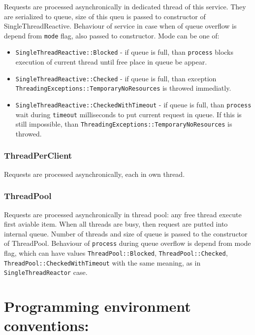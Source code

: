 \documentclass[10pt]{article}
\begin{document}
  Requests are processed asynchronically in dedicated thread of this service.
They are serialized to queue, size of this queu is passed to constructor
 of SingleThreadReactive. Behaviour of service in case when of queue overflow
is depend from \verb|mode| flag, also passed to constructor.
 Mode can be one of:
 \begin{itemize}
   \item \verb|SingleThreadReactive::Blocked| - if queue is full, than 
  \verb|process| blocks execution of current thread until free place in
 queue be appear.
   \item \verb|SingleThreadReactive::Checked| - if queue is full, than 
  exception \verb|ThreadingExceptions::TemporaryNoResources| is throwed immediatly.
   \item \verb|SingleThreadReactive::CheckedWithTimeout| - if queue is full, 
 than \verb|process| wait during \verb|timeout| milliseconds to put current request in queue. If this is still impossible, than \verb|ThreadingExceptions::TemporaryNoResources| is throwed.
 \end{itemize}

\subsubsection{ ThreadPerClient }

 Requests are processed asynchronically, each in own thread.

\subsubsection{ ThreadPool }

 Requests are processed asynchronically in thread pool: any free thread execute
first aviable item. When all threads are busy, then request are putted into internal queue. Number of threads and size of queue is passed to the constructor of
ThreadPool.
 Behaviour of \verb|process| during queue overflow is depend from mode flag,
which can have values \verb|ThreadPool::Blocked|, \verb|ThreadPool::Checked|,
 \verb|ThreadPool::CheckedWithTimeout| with the same meaning, as in \verb|SingleThreadReactor| case.

\section{ Programming environment conventions:  }
\end{document}
